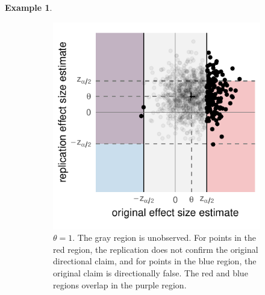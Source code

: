 \documentclass[aoas, preprint]{imsart}
\theoremstyle{definition}
\newtheorem{example}{Example}
\theoremstyle{custom}
\begin{document}
\begin{example}
\begin{figure}[htbp]
\begin{subfigure}[t]{0.39\hsize}
	      \centering
	      \includegraphics[width=\hsize]{naive-same-dir-theta1}
	      \caption{$\theta=1$. The gray region is unobserved. For points in the red region, the replication does not confirm the original directional claim, and for points in the blue region, the original claim is directionally false. The red and blue regions overlap in the purple region.}
	    \label{fig:naive-same-dir-theta1}
	    \end{subfigure}
	    \caption{}
	  \label{fig:naive-same-dir}
	  \end{figure}


\end{example}
\end{document}
